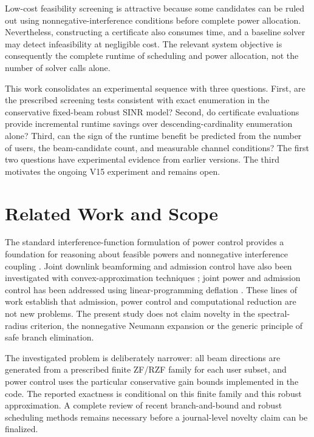 \documentclass[journal]{IEEEtran}
\begin{document}
Low-cost feasibility screening is attractive because some candidates can be ruled out using nonnegative-interference conditions before complete power allocation. Nevertheless, constructing a certificate also consumes time, and a baseline solver may detect infeasibility at negligible cost. The relevant system objective is consequently the complete runtime of scheduling and power allocation, not the number of solver calls alone.

This work consolidates an experimental sequence with three questions. First, are the prescribed screening tests consistent with exact enumeration in the conservative fixed-beam robust SINR model? Second, do certificate evaluations provide incremental runtime savings over descending-cardinality enumeration alone? Third, can the sign of the runtime benefit be predicted from the number of users, the beam-candidate count, and measurable channel conditions? The first two questions have experimental evidence from earlier versions. The third motivates the ongoing V15 experiment and remains open.

\section{Related Work and Scope}
The standard interference-function formulation of power control provides a foundation for reasoning about feasible powers and nonnegative interference coupling \cite{Yates1995}. Joint downlink beamforming and admission control have also been investigated with convex-approximation techniques \cite{Matskani2008}; joint power and admission control has been addressed using linear-programming deflation \cite{Liu2013}. These lines of work establish that admission, power control and computational reduction are not new problems. The present study does not claim novelty in the spectral-radius criterion, the nonnegative Neumann expansion or the generic principle of safe branch elimination.

The investigated problem is deliberately narrower: all beam directions are generated from a prescribed finite ZF/RZF family for each user subset, and power control uses the particular conservative gain bounds implemented in the code. The reported exactness is conditional on this finite family and this robust approximation. A complete review of recent branch-and-bound and robust scheduling methods remains necessary before a journal-level novelty claim can be finalized.
\end{document}
